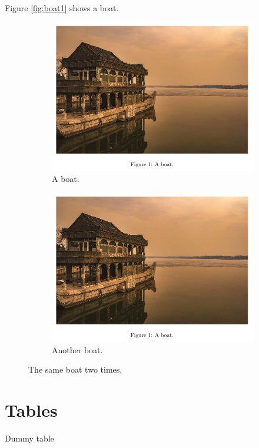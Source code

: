 \documentclass{article}
\begin{document}
    Figure \ref{fig:boat1} shows a boat.

    \begin{figure}[h!]
	\centering
	\begin{subfigure}[b]{0.4\linewidth}
		\includegraphics[width=\linewidth]{images/boat.png}
		\caption{A boat.}
	\end{subfigure}
	\begin{subfigure}[b]{0.4\linewidth}
		\includegraphics[width=\linewidth]{images/boat.png}
		\caption{Another boat.}
	\end{subfigure}
	\caption{The same boat two times.}
	\label{fig:twoboats}
    \end{figure}

    \newpage

    \section{Tables}

    \begin{table}[h!]
	\caption{Dummy table}
    \end{table}

    \newpage

    \begin{appendix}
	\listoffigures
	\listoftables
    \end{appendix}
\end{document}
